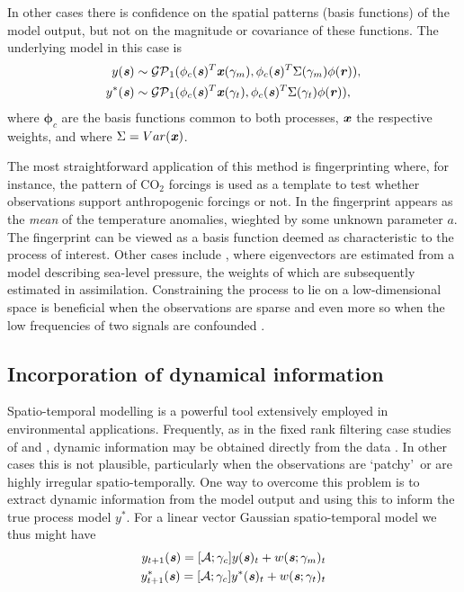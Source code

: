 \documentclass[10pt,a4paper]{article}
\newcommand{\phib} {\boldsymbol{\phi}}
\newcommand{\xvec} {\textbf{\textit{x}}}
\newcommand{\svec} {\textbf{\textit{s}}}
\newcommand{\rvec} {\textbf{\textit{r}}}
\begin{document}
In other cases there is confidence on the spatial patterns (basis functions) of the model output, but not on the magnitude or covariance of these functions. The underlying model in this case is
\begin{align}
y(\svec) &\sim \mathcal{GP}_1(\phi_c(\svec)^T\xvec(\gamma_m),  \phi_c(\svec)^T\Sigma(\gamma_m)\phi(\rvec)), \\
y^*(\svec) &\sim \mathcal{GP}_1(\phi_c(\svec)^T\xvec(\gamma_t),  \phi_c(\svec)^T\Sigma(\gamma_t)\phi(\rvec)), 
\end{align}
\noindent where $\phib_c$ are the basis functions common to both processes, $\xvec$ the respective weights, and where $\Sigma = Var(\xvec)$. 

The most straightforward application of this method is fingerprinting where, for instance, the pattern of CO$_2$ forcings is used as a template to test whether observations support anthropogenic forcings or not. In \citep{Berliner_2000} the fingerprint appears as the \emph{mean} of the temperature anomalies, wieghted by some unknown parameter $a$. The fingerprint can be viewed as a basis function deemed as characteristic to the process of interest. Other cases include \cite{Wikle_2001}, where eigenvectors are estimated from a model describing sea-level pressure, the weights of which are subsequently estimated in assimilation. Constraining the process to lie on a low-dimensional space is beneficial when the observations are sparse and even more so when the low frequencies of two signals are confounded \citep{Zammit_2014}.


\subsection{Incorporation of dynamical information}

Spatio-temporal modelling is a powerful tool extensively employed in environmental applications. Frequently, as in the fixed rank filtering case studies of \cite{Cressie_2010} and \cite{Kang_2010}, dynamic information may be obtained directly from the data \citep[see also][]{Wikle_2002,Dewar_2009}. In other cases this is not plausible, particularly when the observations are \lq patchy\rq~or are highly irregular spatio-temporally. One way to overcome this problem is to extract dynamic information from the model output and using this to inform the true process model $y^*$. For a linear vector Gaussian spatio-temporal model we thus might have
\begin{align}
y_{t+1}(\svec) = [\mathcal{A};\gamma_c]y(\svec)_t + w(\svec;\gamma_m)_t \\
y_{t+1}^*(\svec) = [\mathcal{A};\gamma_c]y^*(\svec)_t + w(\svec;\gamma_t)_t 
\end{align}
\end{document}
